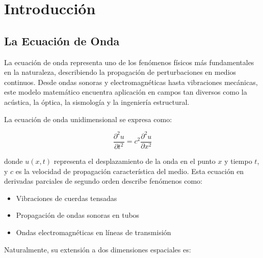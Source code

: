 \documentclass[a4paper]{article}
\begin{document}


\maketitle

\tableofcontents
\newpage

\section{Introducción}

\subsection{La Ecuación de Onda}

La ecuación de onda representa uno de los fenómenos físicos más fundamentales en la naturaleza, describiendo la propagación de
perturbaciones en medios continuos. Desde ondas sonoras y electromagnéticas hasta vibraciones mecánicas, este modelo matemático
encuentra aplicación en campos tan diversos como la acústica, la óptica, la sismología y la ingeniería estructural.

La ecuación de onda unidimensional se expresa como:

\begin{equation}
    \frac{\partial^2 u}{\partial t^2} = c^2 \frac{\partial^2 u}{\partial x^2}
\end{equation}

donde $u(x,t)$ representa el desplazamiento de la onda en el punto $x$ y tiempo $t$, y $c$ es la velocidad de propagación característica
del medio. Esta ecuación en derivadas parciales de segundo orden describe fenómenos como:

\begin{itemize}
    \item Vibraciones de cuerdas tensadas
    \item Propagación de ondas sonoras en tubos
    \item Ondas electromagnéticas en líneas de transmisión
\end{itemize}

Naturalmente, su extensión a dos dimensiones espaciales es:
\end{document}
